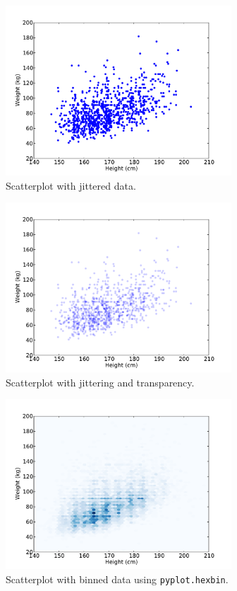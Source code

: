\documentclass[12pt]{book}
\begin{document}
\begin{figure}
\centerline{\includegraphics[height=2.5in]{figs/scatter2.pdf}}
\caption{Scatterplot with jittered data.}
\label{scatterplot2}
\end{figure}

\begin{figure}
\centerline{\includegraphics[height=2.5in]{figs/scatter3.pdf}}
\caption{Scatterplot with jittering and transparency.}
\label{scatterplot3}
\end{figure}

\begin{figure}
\centerline{\includegraphics[height=2.5in]{figs/scatter4.pdf}}
\caption{Scatterplot with binned data using {\tt pyplot.hexbin}.}
\label{scatterplot4}
\end{figure}
\end{document}
